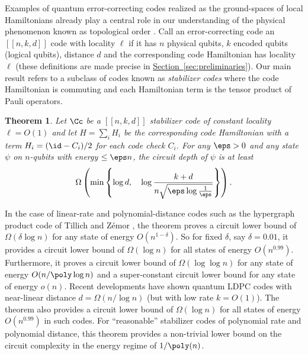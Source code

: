 \documentclass[11pt]{article}
\newcommand{\expref}[2]{\texorpdfstring{\hyperref[#2]{#1~\ref{#2}}}{#1~\ref{#2}}}
\newtheorem{theorem}{Theorem}[section]
\begin{document}
Examples of quantum error-correcting codes realized as the ground-spaces of local Hamiltonians already play a central role in our understanding of the physical phenomenon known as topological order \cite{KITAEV20032,PhysRevLett.107.210501}. 
%
Call an error-correcting code an $[[n,k,d]]$ code with locality $\ell$ if it has $n$ physical qubits, %
$k$ encoded qubits (logical qubits), %
distance $d$ and the corresponding code Hamiltonian has locality $\ell$ (these definitions are made precise in \expref{Section}{sec:preliminaries}).
%
Our main result refers to a subclass of codes known as \emph{stabilizer codes} where the code Hamiltonian is commuting and each Hamiltonian term is the tensor product of Pauli operators.


\begin{theorem}
\label{thm:main}
Let $\Cc$ be a $[[n,k,d]]$ stabilizer code of constant locality $\ell=O(1)$ and let $H=\sum_i H_i$ be the corresponding code Hamiltonian with a term $H_i = (\id - C_i)/2$ for each code check $C_i$. For any $\eps>0$ and any state $\psi$ on $n$-qubits with energy $\leq\eps n$, the circuit depth of $\psi$ is at least
\begin{align}
    \Omega \left( \min \left\{ \log d, \quad \log {\frac{k + d}{n\sqrt{\eps \log\frac{1}{\eps}}}} \right\} \right).
\end{align}
\end{theorem}


In the case of linear-rate and polynomial-distance codes such as the hypergraph product code of Tillich and Z\'emor \cite{5205648}, the theorem proves a circuit lower bound of $\Omega(\delta \log n)$ for any state of energy $O(n^{1-\delta})$. So for fixed $\delta$, say $\delta = 0.01$, it provides a circuit lower bound of $\Omega(\log n)$ for all states of energy $O(n^{0.99})$. Furthermore, it proves a circuit lower bound of $\Omega(\log \log n)$ for any state of energy $O(n/\poly \log n)$ and a super-constant circuit lower bound for any state of energy $o(n)$. {Recent developments \cite{panteleev2020quantum, hastings2020fiber,Breuckmann2020BalancedPQ} have shown quantum LDPC codes with near-linear distance $d=\Omega(n/\log n)$  (but with low rate $k=O(1)$). The theorem also provides a circuit lower bound of $\Omega(\log n)$ for all states of energy $O(n^{0.99})$ in such codes.}
For ``reasonable'' stabilizer codes of polynomial rate and polynomial distance, this theorem provides a non-trivial lower bound on the circuit complexity in the energy regime of $1/\poly(n)$. 
\end{document}
